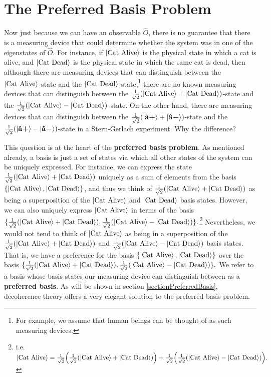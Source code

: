 \section{The Preferred Basis Problem\protect\footnotemark}
Now just because we can have an observable $\hat{O}$, there is no guarantee that there is a measuring device that could determine whether the system was in one of the eigenstates of $\hat{O}$. For instance, if $\ket{\text{Cat Alive}}$ is the physical state in which a cat is alive, and $\ket{\text{Cat Dead}}$ is the physical state in which the same cat is dead, then although there are measuring devices that can distinguish between the $\ket{\text{Cat Alive}}$-state and the $\ket{\text{Cat Dead}}$-state,\footnote{For example, we assume that human beings can be thought of as such measuring devices.} there are no known measuring devices that can distinguish between the $\frac{1}{\sqrt{2}}(\ket{\text{Cat Alive}}+\ket{\text{Cat Dead}})$-state and the $\frac{1}{\sqrt{2}}(\ket{\text{Cat Alive}}-\ket{\text{Cat Dead}})$-state. On the other hand, there are measuring devices that can distinguish between the $\frac{1}{\sqrt{2}}(\ket{\vb{\hat{{a}}}\bm{+}}+\ket{\vb{\hat{{a}}}\bm{-}})$-state and the $\frac{1}{\sqrt{2}}(\ket{\vb{\hat{{a}}}\bm{+}}-\ket{\vb{\hat{{a}}}\bm{-}})$-state in a Stern-Gerlach experiment. Why the difference?

This question is at the heart of the \textbf{preferred basis problem}. As mentioned already, a basis is just a set of states via which all other states of the system can be uniquely expressed. For instance, we can express the state $\frac{1}{\sqrt{2}}(\ket{\text{Cat Alive}}+\ket{\text{Cat Dead}})$ uniquely as a sum of elements from the basis $\{\ket{\text{Cat Alive}}, \ket{\text{Cat Dead}}\}$, and thus we think of $\frac{1}{\sqrt{2}}(\ket{\text{Cat Alive}}+\ket{\text{Cat Dead}})$ as being a superposition of the $\ket{\text{Cat Alive}}$ and $\ket{\text{Cat Dead}}$ basis states. However, we can also uniquely express  $\ket{\text{Cat Alive}}$ in terms of the basis $\{\frac{1}{\sqrt{2}}(\ket{\text{Cat Alive}}+\ket{\text{Cat Dead}}), \frac{1}{\sqrt{2}}(\ket{\text{Cat Alive}}-\ket{\text{Cat Dead}})\}.$\footnote{i.e. $\ket{\text{Cat Alive}}= \frac{1}{\sqrt{2}}\Big(\frac{1}{\sqrt{2}}(\ket{\text{Cat Alive}}+\ket{\text{Cat Dead}})\Big)+\frac{1}{\sqrt{2}}\Big( \frac{1}{\sqrt{2}}(\ket{\text{Cat Alive}}-\ket{\text{Cat Dead}})\Big). $} Nevertheless, we would not tend to think of $\ket{\text{Cat Alive}}$ as being in a superposition of the $\frac{1}{\sqrt{2}}(\ket{\text{Cat Alive}}+\ket{\text{Cat Dead}}) $ and $\frac{1}{\sqrt{2}}(\ket{\text{Cat Alive}}-\ket{\text{Cat Dead}})$ basis states. That is, we have a preference for the basis $\{\ket{\text{Cat Alive}}, \ket{\text{Cat Dead}}\}$ over the basis $\{\frac{1}{\sqrt{2}}(\ket{\text{Cat Alive}}+\ket{\text{Cat Dead}}), \frac{1}{\sqrt{2}}(\ket{\text{Cat Alive}}-\ket{\text{Cat Dead}})\}.$ We refer to a basis whose basis states our measuring device can distinguish between as a \textbf{preferred basis}. As will be shown in section \ref{sectionPreferredBasis}, decoherence theory offers a very elegant solution to the preferred basis problem.
